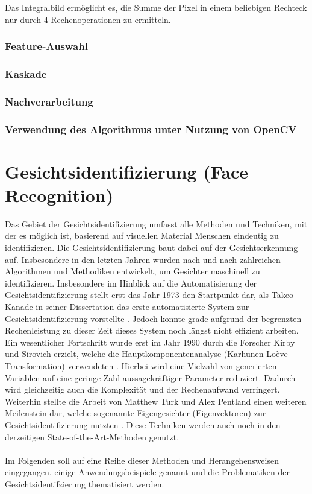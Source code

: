 \documentclass[doktyp=semarbeit, sprache=german]{TUBAFarbeiten}
\begin{document}
Das Integralbild ermöglicht es, die Summe der Pixel in einem beliebigen Rechteck nur durch 4 Rechenoperationen zu ermitteln.

\subsubsection{Feature-Auswahl}

\subsubsection{Kaskade}

\subsubsection{Nachverarbeitung}

\subsubsection{Verwendung des Algorithmus unter Nutzung von OpenCV}

\newpage
\section{Gesichtsidentifizierung (Face Recognition)}
\label{identifizierung}
Das Gebiet der Gesichtsidentifizierung umfasst alle Methoden und Techniken, mit der es möglich ist, basierend auf visuellen Material Menschen eindeutig zu identifizieren. Die Gesichtsidentifizierung baut dabei auf der Gesichtserkennung auf. Insbesondere in den letzten Jahren wurden nach und nach zahlreichen Algorithmen und Methodiken entwickelt, um Gesichter maschinell zu identifizieren. Insbesondere im Hinblick auf die Automatisierung der Gesichtsidentifizierung stellt erst das Jahr 1973 den Startpunkt dar, als Takeo Kanade in seiner Dissertation das erste automatisierte System zur Gesichtsidentifizierung vorstellte \cite{Takeo}. Jedoch konnte grade aufgrund der begrenzten Rechenleistung zu dieser Zeit dieses System noch längst nicht effizient arbeiten. Ein wesentlicher Fortschritt wurde erst im Jahr 1990 durch die Forscher Kirby und Sirovich erzielt, welche die Hauptkomponentenanalyse (Karhunen-Loève-Transformation) verwendeten \cite{Kirby}. Hierbei wird eine Vielzahl von generierten Variablen auf eine geringe Zahl aussagekräftiger Parameter reduziert. Dadurch wird gleichzeitig auch die Komplexität und der Rechenaufwand verringert. Weiterhin stellte die Arbeit von Matthew Turk und Alex Pentland einen weiteren Meilenstein dar, welche sogenannte Eigengesichter (Eigenvektoren) zur Gesichtsidentifizierung nutzten \cite{Turk}. Diese Techniken werden auch noch in den derzeitigen State-of-the-Art-Methoden genutzt.
\\\\Im Folgenden soll auf eine Reihe dieser Methoden und Herangehensweisen eingegangen, einige Anwendungsbeispiele genannt und die Problematiken der Gesichtsidentifzierung thematisiert werden.
\end{document}
